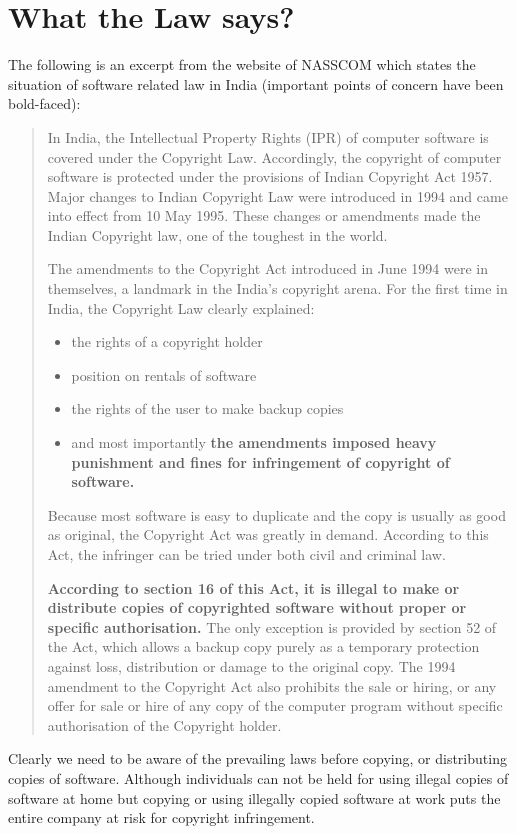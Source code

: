 \section{What the Law says?}
The following is an excerpt from the website of NASSCOM\textsuperscript{\cite{iprindia}} which states the situation of software related law in India (important points of concern have been bold-faced):
\begin{quotation}
In India, the Intellectual Property Rights (IPR) of computer software is covered under the Copyright Law. Accordingly, the copyright of computer software is protected under the provisions of Indian Copyright Act 1957. Major changes to Indian Copyright Law were introduced in 1994 and came into effect from 10 May 1995. These changes or amendments made the Indian Copyright law, one of the toughest in the world.

The amendments to the Copyright Act introduced in June 1994 were in themselves, a landmark in the India's copyright arena. For the first time in India, the Copyright Law clearly explained:
\begin{itemize}
\item the rights of a copyright holder
\item position on rentals of software
\item the rights of the user to make backup copies
\item and most importantly \textbf{the amendments imposed heavy punishment and fines for infringement of copyright of software.}
\end{itemize}

Because most software is easy to duplicate and the copy is usually as good as original, the Copyright Act was greatly in demand. According to this Act, the infringer can be tried under both civil and criminal law.

\textbf{According to section 16 of this Act, it is illegal to make or distribute copies of copyrighted software without proper or specific authorisation.} The only exception is provided by section 52 of the Act, which allows a backup copy purely as a temporary protection against loss, distribution or damage to the original copy. The 1994 amendment to the Copyright Act also prohibits the sale or hiring, or any offer for sale or hire of any copy of the computer program without specific authorisation of the Copyright holder. 
\end{quotation}
Clearly we need to be aware of the prevailing laws before copying, or distributing copies of software. Although individuals can not be held for using illegal copies of software at home but copying or using illegally copied software at work puts the entire company at risk for copyright infringement.


